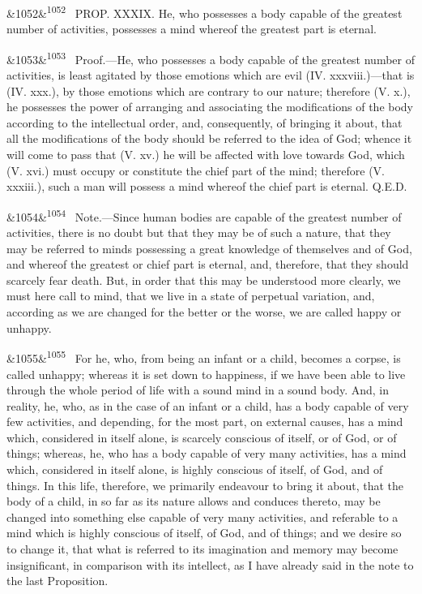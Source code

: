 \documentclass[12pt]{article}
\newcommand{\para}[1][]{\par\noindent\ifx&#1&\else\textsuperscript{\footnotesize #1}~\fi}
\begin{document}
\para[1052] PROP. XXXIX. He, who possesses a body capable of the greatest number of activities, possesses a mind whereof the greatest part is eternal.

\para[1053] Proof.---He, who possesses a body capable of the greatest number of activities, is least agitated by those emotions which are evil (IV. xxxviii.)---that is (IV. xxx.), by those emotions which are contrary to our nature; therefore (V. x.), he possesses the power of arranging and associating the modifications of the body according to the intellectual order, and, consequently, of bringing it about, that all the modifications of the body should be referred to the idea of God; whence it will come to pass that (V. xv.) he will be affected with love towards God, which (V. xvi.) must occupy or constitute the chief part of the mind; therefore (V. xxxiii.), such a man will possess a mind whereof the chief part is eternal. Q.E.D.

\para[1054] Note.---Since human bodies are capable of the greatest number of activities, there is no doubt but that they may be of such a nature, that they may be referred to minds possessing a great knowledge of themselves and of God, and whereof the greatest or chief part is eternal, and, therefore, that they should scarcely fear death. But, in order that this may be understood more clearly, we must here call to mind, that we live in a state of perpetual variation, and, according as we are changed for the better or the worse, we are called happy or unhappy.

\para[1055] For he, who, from being an infant or a child, becomes a corpse, is called unhappy; whereas it is set down to happiness, if we have been able to live through the whole period of life with a sound mind in a sound body. And, in reality, he, who, as in the case of an infant or a child, has a body capable of very few activities, and depending, for the most part, on external causes, has a mind which, considered in itself alone, is scarcely conscious of itself, or of God, or of things; whereas, he, who has a body capable of very many activities, has a mind which, considered in itself alone, is highly conscious of itself, of God, and of things. In this life, therefore, we primarily endeavour to bring it about, that the body of a child, in so far as its nature allows and conduces thereto, may be changed into something else capable of very many activities, and referable to a mind which is highly conscious of itself, of God, and of things; and we desire so to change it, that what is referred to its imagination and memory may become insignificant, in comparison with its intellect, as I have already said in the note to the last Proposition.
\end{document}
